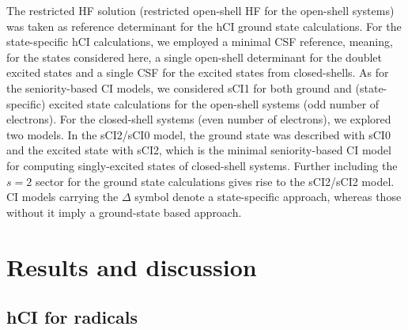 \documentclass[aip,jcp,reprint,noshowkeys,superscriptaddress]{revtex4-1}
\begin{document}
The restricted HF solution (restricted open-shell HF for the open-shell systems) was taken as reference determinant for the hCI ground state calculations.
For the state-specific hCI calculations, we employed a minimal CSF reference, \cite{Kossoski_2023}
meaning, for the states considered here, a single open-shell determinant for the doublet excited states and a single CSF for the excited states from closed-shells.
As for the seniority-based CI models, 
we considered sCI1 for both ground and (state-specific) excited state calculations for the open-shell systems (odd number of electrons).
For the closed-shell systems (even number of electrons), we explored two models.
In the sCI2/sCI0 model, the ground state was described with sCI0 and the excited state with sCI2, which is the minimal seniority-based CI model for computing singly-excited states of closed-shell systems.
Further including the $s=2$ sector for the ground state calculations gives rise to the sCI2/sCI2 model.
CI models carrying the $\Delta$ symbol denote a state-specific approach, whereas those without it imply a ground-state based approach.


\section{Results and discussion}
\label{sec:res}


\subsection{hCI for radicals}
\label{sec:res_A}

\end{document}
